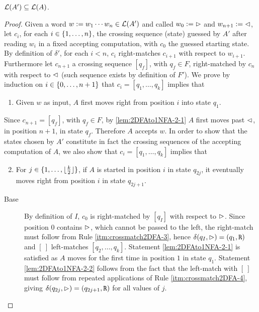 \begin{lemm}\label{lem:2DFAto1NFA-2}
	$\mathcal L(A')\subseteq\mathcal L(A)$.
\end{lemm}
\begin{proof}
	Given a word $w:=w_1\cdots w_n\in\mathcal L(A')$ and called $w_0:=\rhd$ and $w_{n+1}:=\lhd$, let $c_i$, for each $i\in\{1,\dots,n\}$, the crossing sequence (state) guessed by $A'$ after reading $w_i$ in a fixed accepting computation, with $c_0$ the guessed starting state.
	By definition of $\delta'$, for each $i<n$, $c_i$ right-matches $c_{i+1}$ with respect to $w_{i+1}$.
	Furthermore let $c_{n+1}$ a crossing sequence $[q_f]$, with $q_f\in F$, right-matched by $c_n$ with respect to $\lhd$ (such sequence exists by definition of $F'$).
	We prove by induction on $i\in\{0,\dots,n+1\}$ that $c_i=[q_1,\dots,q_k]$ implies that
	\begin{enumerate}[(1)]
		\item \label{lem:2DFAto1NFA-2-1} Given $w$ as input, $A$ first moves right from position $i$ into state $q_1$.
	\end{enumerate}
	Since $c_{n+1}=[q_f]$, with $q_f\in F$, by \ref{lem:2DFAto1NFA-2-1} $A$ first moves past $\lhd$, in position $n+1$, in state $q_f$. Therefore $A$ accepts $w$.
	In order to show that the states chosen by $A'$ constitute in fact the crossing sequences of the accepting computation of $A$, we also show that $c_i=[q_1,\dots,q_k]$ implies that
	\begin{enumerate}[(1)]
		\setcounter{enumi}{1}
		\item \label{lem:2DFAto1NFA-2-2} For $j\in\{1,\dots,\lfloor \frac{k}{2} \rfloor\}$, if $A$ is started in position $i$ in state $q_{2j}$, it eventually moves right from position $i$ in state $q_{2j+1}$.
	\end{enumerate}
	\begin{description}
		\item[Base] By definition of $I$, $c_0$ is right-matched by $[q_I]$ with respect to $\rhd$. Since position $0$ contains $\rhd$, which cannot be passed to the left, the right-match must follow from Rule \ref{itm:crossmatch2DFA-3}, hence $\delta(q_I,\rhd)=(q_1,\mathtt R)$ and $[~]$ left-matches $[q_2,\dots,q_k]$.
		      Statement \ref{lem:2DFAto1NFA-2-1} is satisfied as $A$ moves for the first time in position $1$ in state $q_1$.
		      Statement \ref{lem:2DFAto1NFA-2-2} follows from the fact that the left-match with $[~]$ must follow from repeated applications of Rule \ref{itm:crossmatch2DFA-4}, giving $\delta(q_{2j},\rhd)=(q_{2j+1},\mathtt R)$ for all values of $j$.

\end{description}
\end{proof}
